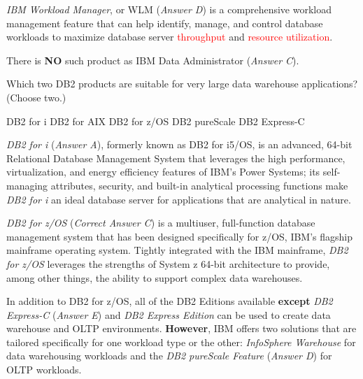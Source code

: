 \documentclass[answers, 11pt]{exam}
\begin{document}
\begin{questions}
\begin{solution}
\textit{IBM Workload Manager}, or WLM (\textit{Answer D}) is a comprehensive workload
management feature that can help identify, manage, and control database workloads to
maximize database server \textcolor{red}{throughput} and \textcolor{red}{resource
 utilization}.
\par

There is \textbf{NO} such product as IBM Data Administrator (\textit{Answer C}).

\end{solution}

\newpage
\addpoints

\question[1]
Which two DB2 products are suitable for very large data warehouse applications? (Choose two.)
\begin{choices}
\choice DB2 for i
\CorrectChoice DB2 for AIX
\CorrectChoice DB2 for z/OS
\choice DB2 pureScale
\choice DB2 Express-C
\end{choices}

\begin{solution}
\textit{DB2 for i} (\textit{Answer A}), formerly known as DB2 for i5/OS, is an
advanced, 64-bit Relational Database Management System that leverages the high
performance, virtualization, and energy efficiency features of IBM's Power Systems; 
its self-managing attributes, security, and built-in analytical processing functions
make \textit{DB2 for i} an ideal database server for {\color{red} applications that 
are analytical in nature}.
\par

\textit{DB2 for z/OS} (\textit{Correct Answer C}) is a multiuser, full-function
database management system that has been designed specifically for z/OS, 
IBM's flagship mainframe operating system. Tightly integrated with the IBM mainframe,
\textit{DB2 for z/OS} leverages the strengths of System z 64-bit architecture to
provide, among other things, the ability to support complex {\color{red} data
warehouses}. 
\par

In addition to DB2 for z/OS, all of the DB2 Editions available \textbf{except} 
\textit{DB2 Express-C} (\textit{Answer E}) and \textit{DB2 Express Edition} can be
used to create data warehouse and OLTP environments. \textbf{However},
IBM offers two solutions that are tailored specifically for one workload type or
the other: \textit{InfoSphere Warehouse} for {\color{red} data warehousing} workloads
and the \textit{DB2 pureScale Feature} (\textit{Answer D}) for {\color{red} OLTP}
workloads.


\end{solution}
\end{questions}
\end{document}
